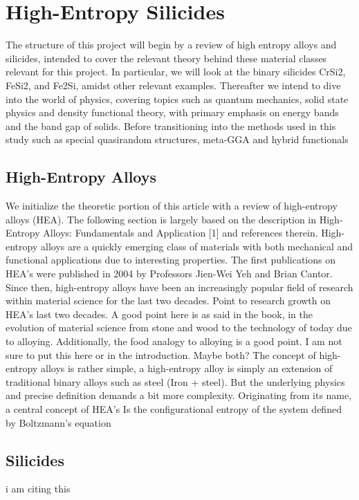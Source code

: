 \chapter{High-Entropy Silicides}
\label{sec:lab}

The structure of this project will begin by a review of high entropy alloys and silicides, intended to cover the relevant theory behind these material classes relevant for this project. In particular, we will look at the binary silicides CrSi2, FeSi2, and Fe2Si, amidst other relevant examples. Thereafter we intend to dive into the world of physics, covering topics such as quantum mechanics, solid state physics and density functional theory, with primary emphasis on energy bands and the band gap of solids. Before transitioning into the methods used in this study such as special quasirandom structures, meta-GGA and hybrid functionals

\section{High-Entropy Alloys}
We initialize the theoretic portion of this article with a review of high-entropy alloys (HEA). The following section is largely based on the description in High-Entropy Alloys: Fundamentals and Application [1] and references therein.
High-entropy alloys are a quickly emerging class of materials with both mechanical and functional applications due to interesting properties. The first publications on HEA’s were published in 2004 by Professors Jien-Wei Yeh and Brian Cantor. Since then, high-entropy alloys have been an increasingly popular field of research within material science for the last two decades. Point to research growth on HEA’s last two decades. A good point here is as said in the book, in the evolution of material science from stone and wood to the technology of today due to alloying. Additionally, the food analogy to alloying is a good point. I am not sure to put this here or in the introduction. Maybe both?
The concept of high-entropy alloys is rather simple, a high-entropy alloy is simply an extension of traditional binary alloys such as steel (Iron + steel). But the underlying physics and precise definition demands a bit more complexity. Originating from its name, a central concept of HEA’s Is the configurational entropy of the system defined by Boltzmann’s equation


\section{Silicides}
i am citing this \cite[95]{AM69}

